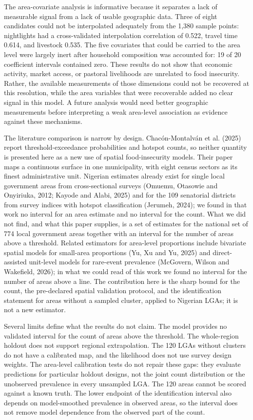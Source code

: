 The area-covariate analysis is informative because it separates a lack of measurable signal from a lack of usable geographic data. Three of eight candidates could not be interpolated adequately from the 1,380 sample points: nightlights had a cross-validated interpolation correlation of 0.522, travel time 0.614, and livestock 0.535. The five covariates that could be carried to the area level were largely inert after household composition was accounted for: 19 of 20 coefficient intervals contained zero. These results do not show that economic activity, market access, or pastoral livelihoods are unrelated to food insecurity. Rather, the available measurements of those dimensions could not be recovered at this resolution, while the area variables that were recoverable added no clear signal in this model. A future analysis would need better geographic measurements before interpreting a weak area-level association as evidence against these mechanisms.

The literature comparison is narrow by design. Chacón-Montalván et al. (2025) report threshold-exceedance probabilities and hotspot counts, so neither quantity is presented here as a new use of spatial food-insecurity models. Their paper maps a continuous surface in one municipality, with eight census sectors as its finest administrative unit. Nigerian estimates already exist for single local government areas from cross-sectional surveys (Omuemu, Otasowie and Onyiriuka, 2012; Kayode and Alabi, 2025) and for the 109 senatorial districts from survey indices with hotspot classification (Jerumeh, 2024); we found in that work no interval for an area estimate and no interval for the count. What we did not find, and what this paper supplies, is a set of estimates for the national set of 774 local government areas together with an interval for the number of areas above a threshold. Related estimators for area-level proportions include bivariate spatial models for small-area proportions (Yu, Xu and Yu, 2025) and direct-assisted unit-level models for rare-event prevalence (McGovern, Wilson and Wakefield, 2026); in what we could read of this work we found no interval for the number of areas above a line. The contribution here is the sharp bound for the count, the pre-declared spatial validation protocol, and the identification statement for areas without a sampled cluster, applied to Nigerian LGAs; it is not a new estimator.

Several limits define what the results do not claim. The model provides no validated interval for the count of areas above the threshold. The whole-region holdout does not support regional extrapolation. The 120 LGAs without clusters do not have a calibrated map, and the likelihood does not use survey design weights. The area-level calibration tests do not repair these gaps: they evaluate predictions for particular holdout designs, not the joint count distribution or the unobserved prevalence in every unsampled LGA. The 120 areas cannot be scored against a known truth. The lower endpoint of the identification interval also depends on model-smoothed prevalence in observed areas, so the interval does not remove model dependence from the observed part of the count.

